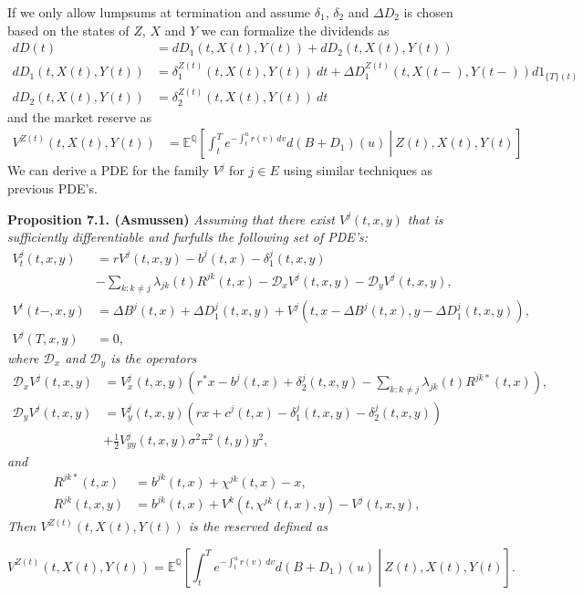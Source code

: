 \documentclass[a4paper,10pt,openany]{book}
\begin{document}
If we only allow lumpsums at termination and assume \(\delta_1\), \(\delta_2\) and \(\Delta D_2\) is chosen based on the states of \(Z\), \(X\) and \(Y\) we can formalize the dividends as
\begin{align*}
dD(t)&=dD_1(t,X(t),Y(t))+dD_2(t,X(t),Y(t))\\
dD_1(t,X(t),Y(t))&=\delta_1^{Z(t)}(t,X(t),Y(t))\ dt+\Delta D_1^{Z(t)}(t,X(t-),Y(t-))d1_{\{T\}(t)}\\
dD_2(t,X(t),Y(t))&=\delta_2^{Z(t)}(t,X(t),Y(t))\ dt
\end{align*}
and the market reserve as
\begin{align*}
V^{Z(t)}(t,X(t),Y(t))&=\mathbb E^\mathbb Q\left[\left.\int_t^Te^{-\int_t^ur(v)\ dv}d(B+D_1)(u)\ \right\vert\ Z(t),X(t),Y(t)\right]
\end{align*}
We can derive a PDE for the family \(V^j\) for \(j\in E\) using similar techniques as previous PDE's.

\textbf{Proposition 7.1. (Asmussen)} \emph{Assuming that there exist \(V^j(t,x,y)\) that is sufficiently differentiable and furfulls the following set of PDE's:}
\begin{align*}
V_t^j(t,x,y)&=rV^j(t,x,y)-b^j(t,x)-\delta_1^j(t,x,y)\\
&-\sum_{k:k\ne j}\lambda_{jk}(t)R^{jk}(t,x)-\mathcal D_x V^j(t,x,y)-\mathcal D_yV^j(t,x,y),\\
V^t(t-,x,y)&=\Delta B^j(t,x)+\Delta D_1^j(t,x,y)+V^j(t,x-\Delta B^j(t,x),y-\Delta D_1^j(t,x,y)),\\
V^j(T,x,y)&=0,
\end{align*}
\emph{where \(\mathcal D_x\) and \(\mathcal D_y\) is the operators}
\begin{align*}
\mathcal D_xV^j(t,x,y)&=V_x^j(t,x,y)\left(r^*x-b^j(t,x)+\delta_2^j(t,x,y)-\sum_{k:k\ne j}\lambda_{jk}(t)R^{jk*}(t,x)\right),\\
\mathcal D_yV^j(t,x,y)&=V_y^j(t,x,y)\left(rx+c^j(t,x)-\delta_1^j(t,x,y)-\delta_2^j(t,x,y)\right)\\
&+\frac{1}{2}V_{yy}^j(t,x,y)\sigma^2 \pi^2(t,y)y^2,
\end{align*}
\emph{and}
\begin{align*}
R^{jk*}(t,x)&=b^{jk}(t,x)+\chi^{jk}(t,x)-x,\\
R^{jk}(t,x,y)&=b^{jk}(t,x)+V^k(t,\chi^{jk}(t,x),y)-V^j(t,x,y),
\end{align*}
\emph{Then \(V^{Z(t)}(t,X(t),Y(t))\) is the reserved defined as}

\[
V^{Z(t)}(t,X(t),Y(t))=\mathbb E^\mathbb Q\left[\left.\int_t^Te^{-\int_t^ur(v)\ dv}d(B+D_1)(u)\ \right\vert\ Z(t),X(t),Y(t)\right].
\]
\end{document}
